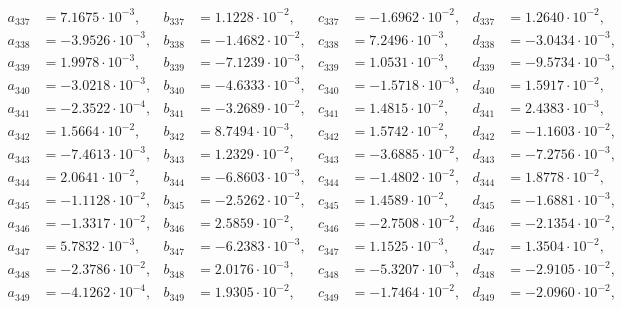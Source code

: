 \begin{align*}
  a_{ 337 } &= 7.1675 \cdot 10^{ -3 }, & b_{ 337 } &= 1.1228 \cdot 10^{ -2 }, & c_{ 337 } &= -1.6962 \cdot 10^{ -2 }, & d_{ 337 } &= 1.2640 \cdot 10^{ -2 }, \\ 
  a_{ 338 } &= -3.9526 \cdot 10^{ -3 }, & b_{ 338 } &= -1.4682 \cdot 10^{ -2 }, & c_{ 338 } &= 7.2496 \cdot 10^{ -3 }, & d_{ 338 } &= -3.0434 \cdot 10^{ -3 }, \\ 
  a_{ 339 } &= 1.9978 \cdot 10^{ -3 }, & b_{ 339 } &= -7.1239 \cdot 10^{ -3 }, & c_{ 339 } &= 1.0531 \cdot 10^{ -3 }, & d_{ 339 } &= -9.5734 \cdot 10^{ -3 }, \\ 
  a_{ 340 } &= -3.0218 \cdot 10^{ -3 }, & b_{ 340 } &= -4.6333 \cdot 10^{ -3 }, & c_{ 340 } &= -1.5718 \cdot 10^{ -3 }, & d_{ 340 } &= 1.5917 \cdot 10^{ -2 }, \\ 
  a_{ 341 } &= -2.3522 \cdot 10^{ -4 }, & b_{ 341 } &= -3.2689 \cdot 10^{ -2 }, & c_{ 341 } &= 1.4815 \cdot 10^{ -2 }, & d_{ 341 } &= 2.4383 \cdot 10^{ -3 }, \\ 
  a_{ 342 } &= 1.5664 \cdot 10^{ -2 }, & b_{ 342 } &= 8.7494 \cdot 10^{ -3 }, & c_{ 342 } &= 1.5742 \cdot 10^{ -2 }, & d_{ 342 } &= -1.1603 \cdot 10^{ -2 }, \\ 
  a_{ 343 } &= -7.4613 \cdot 10^{ -3 }, & b_{ 343 } &= 1.2329 \cdot 10^{ -2 }, & c_{ 343 } &= -3.6885 \cdot 10^{ -2 }, & d_{ 343 } &= -7.2756 \cdot 10^{ -3 }, \\ 
  a_{ 344 } &= 2.0641 \cdot 10^{ -2 }, & b_{ 344 } &= -6.8603 \cdot 10^{ -3 }, & c_{ 344 } &= -1.4802 \cdot 10^{ -2 }, & d_{ 344 } &= 1.8778 \cdot 10^{ -2 }, \\ 
  a_{ 345 } &= -1.1128 \cdot 10^{ -2 }, & b_{ 345 } &= -2.5262 \cdot 10^{ -2 }, & c_{ 345 } &= 1.4589 \cdot 10^{ -2 }, & d_{ 345 } &= -1.6881 \cdot 10^{ -3 }, \\ 
  a_{ 346 } &= -1.3317 \cdot 10^{ -2 }, & b_{ 346 } &= 2.5859 \cdot 10^{ -2 }, & c_{ 346 } &= -2.7508 \cdot 10^{ -2 }, & d_{ 346 } &= -2.1354 \cdot 10^{ -2 }, \\ 
  a_{ 347 } &= 5.7832 \cdot 10^{ -3 }, & b_{ 347 } &= -6.2383 \cdot 10^{ -3 }, & c_{ 347 } &= 1.1525 \cdot 10^{ -3 }, & d_{ 347 } &= 1.3504 \cdot 10^{ -2 }, \\ 
  a_{ 348 } &= -2.3786 \cdot 10^{ -2 }, & b_{ 348 } &= 2.0176 \cdot 10^{ -3 }, & c_{ 348 } &= -5.3207 \cdot 10^{ -3 }, & d_{ 348 } &= -2.9105 \cdot 10^{ -2 }, \\ 
  a_{ 349 } &= -4.1262 \cdot 10^{ -4 }, & b_{ 349 } &= 1.9305 \cdot 10^{ -2 }, & c_{ 349 } &= -1.7464 \cdot 10^{ -2 }, & d_{ 349 } &= -2.0960 \cdot 10^{ -2 }, \\ 

\end{align*}
